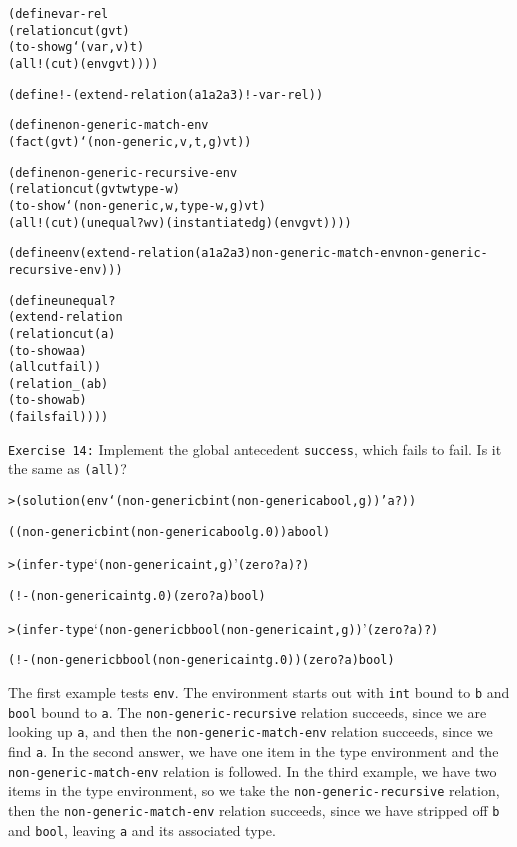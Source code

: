 \begin{alltt}
(define var-rel
  (relation cut (g v t)
    (to-show g `(var ,v) t)
    (all! (cut) (env g v t))))

(define !- (extend-relation (a1 a2 a3) !- var-rel))
\end{alltt}

\begin{alltt}
(define non-generic-match-env
  (fact (g v t) `(non-generic ,v ,t ,g) v t))

(define non-generic-recursive-env
  (relation cut (g v t w type-w)
    (to-show `(non-generic ,w ,type-w ,g) v t)
    (all! (cut) (unequal? w v) (instantiated g) (env g v t))))

(define env (extend-relation (a1 a2 a3) non-generic-match-env non-generic-recursive-env)))
\end{alltt}

\begin{alltt}
(define unequal?
  (extend-relation
    (relation cut (a)
      (to-show a a)
      (all cut fail))
    (relation _ (a b)
      (to-show a b)
      (fails fail))))
\end{alltt}

\texttt{Exercise 14:} Implement the global antecedent
\texttt{success}, which fails to fail.  Is it the same as \texttt{(all)}?

\begin{alltt}
> (solution (env `(non-generic b int (non-generic a bool ,g)) 'a ?))

((non-generic b int (non-generic a bool g.0)) a bool)
\end{alltt}

\begin{alltt}
> (infer-type `(non-generic a int ,g) '(zero? a) ?)

(!- (non-generic a int g.0) (zero? a) bool)
\end{alltt}

\begin{alltt}
> (infer-type `(non-generic b bool (non-generic a int ,g)) '(zero? a) ?)

(!- (non-generic b bool (non-generic a int g.0)) (zero? a) bool)
\end{alltt}

The first example tests \texttt{env}.  The environment starts out with
\texttt{int} bound to \texttt{b} and \texttt{bool} bound to
\texttt{a}.  The \texttt{non-generic-recursive} relation succeeds,
since we are looking up \texttt{a}, and then the
\texttt{non-generic-match-env} relation succeeds, since we find
\texttt{a}.  In the second answer, we have one item in the type
environment and the \texttt{non-generic-match-env} relation is
followed. In the third example, we have two items in the type
environment, so we take the \texttt{non-generic-recursive} relation, 
then the \texttt{non-generic-match-env} relation succeeds,
since we have stripped off \texttt{b} and \texttt{bool}, leaving
\texttt{a} and its associated type.

